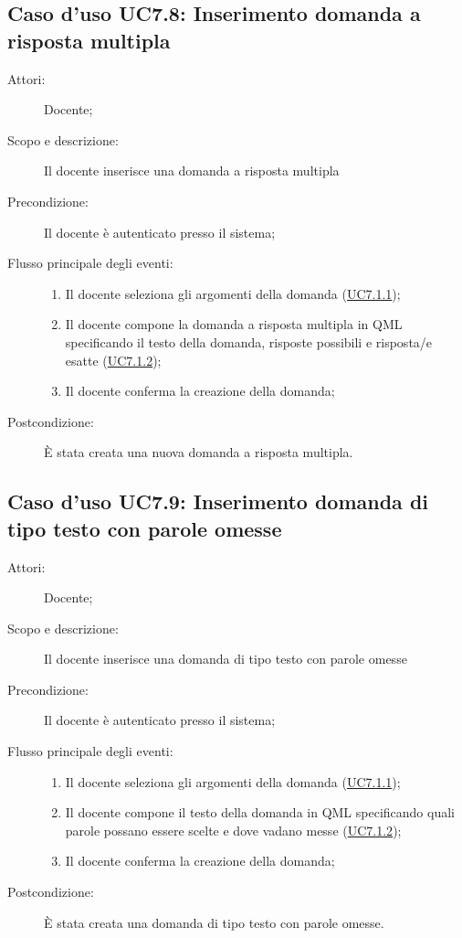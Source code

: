 \subsection{Caso d'uso UC7.8: Inserimento domanda a risposta multipla}\begin{description}
\item[Attori:] Docente;
\item[Scopo e descrizione:] Il docente inserisce una domanda a risposta multipla
      \item[Precondizione:] Il docente è autenticato presso il sistema;

        \item[Flusso principale degli eventi:] \begin{enumerate}
          \item Il docente seleziona gli argomenti della domanda (\hyperlink{UC7.1.1}{UC7.1.1});
          \item Il docente compone la domanda a risposta multipla in QML specificando il testo della domanda, risposte possibili e risposta/e esatte (\hyperlink{UC7.1.2}{UC7.1.2});
          \item Il docente conferma la creazione della domanda;

      \end{enumerate}
    \item[Postcondizione:] È stata creata una nuova domanda a risposta multipla.
  \end{description}
\hypertarget{UC7.9}{}
\subsection{Caso d'uso UC7.9: Inserimento domanda di tipo testo con parole omesse}\begin{description}
\item[Attori:] Docente;
\item[Scopo e descrizione:] Il docente inserisce una domanda di tipo testo con parole omesse
      \item[Precondizione:] Il docente è autenticato presso il sistema;

        \item[Flusso principale degli eventi:] \begin{enumerate}
          \item Il docente seleziona gli argomenti della domanda (\hyperlink{UC7.1.1}{UC7.1.1});
          \item Il docente compone il testo della domanda in QML specificando quali parole possano essere scelte e dove vadano messe  (\hyperlink{UC7.1.2}{UC7.1.2});
          \item Il docente conferma la creazione della domanda;

      \end{enumerate}
    \item[Postcondizione:] È stata creata una domanda di tipo testo con parole omesse.
  \end{description}
\hypertarget{UC7.10}{}
